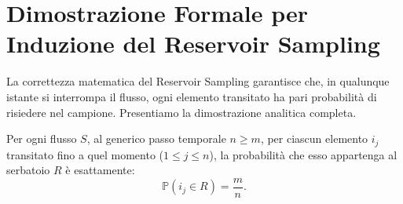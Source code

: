 \FloatBarrier
\section{Dimostrazione Formale per Induzione del Reservoir Sampling}
\label{sec:reservoir-sampling-proof}

La correttezza matematica del Reservoir Sampling garantisce che, in qualunque istante si interrompa il flusso, ogni elemento transitato ha pari probabilità di risiedere nel campione. Presentiamo la dimostrazione analitica completa.

\begin{theorem}
Per ogni flusso $S$, al generico passo temporale $n \ge m$, per ciascun elemento $i_j$ transitato fino a quel momento ($1 \le j \le n$), la probabilità che esso appartenga al serbatoio $R$ è esattamente:
\begin{equation}
  \mathbb{P}(i_j \in R) = \frac{m}{n}.
\end{equation}
\end{theorem}

